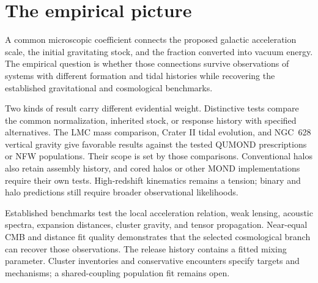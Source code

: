 \section{The empirical picture}

A common microscopic coefficient connects the proposed galactic
acceleration scale, the initial gravitating stock, and the fraction
converted into vacuum energy. The empirical question is whether those
connections survive observations of systems with different formation
and tidal histories while recovering the established gravitational and
cosmological benchmarks.

Two kinds of result carry different evidential weight. Distinctive tests
compare the common normalization, inherited stock, or response history
with specified alternatives. The LMC mass comparison, Crater II tidal
evolution, and NGC~628 vertical gravity give favorable results against
the tested QUMOND prescriptions or NFW populations. Their scope is set
by those comparisons. Conventional halos also retain assembly history,
and cored halos or other MOND implementations require their own tests.
High-redshift kinematics remains a tension; binary and halo predictions
still require broader observational likelihoods.

Established benchmarks test the local acceleration relation, weak
lensing, acoustic spectra, expansion distances, cluster gravity, and
tensor propagation. Near-equal CMB and distance fit quality demonstrates
that the selected cosmological branch can recover those observations.
The release history contains a fitted mixing parameter. Cluster
inventories and conservative encounters specify targets and mechanisms;
a shared-coupling population fit remains open.

